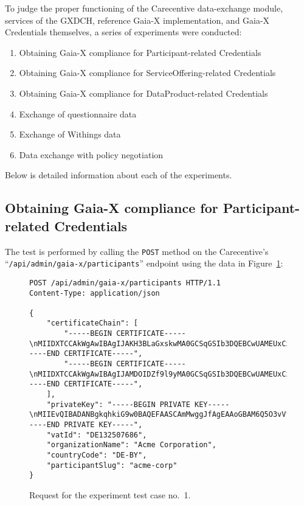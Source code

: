 To judge the proper functioning of the Carecentive data-exchange module, services of the GXDCH, reference Gaia-X implementation, and Gaia-X Credentials themselves, a series of experiments were conducted:
\begin{enumerate}
    \item Obtaining Gaia-X compliance for Participant-related Credentials
    \item Obtaining Gaia-X compliance for ServiceOffering-related Credentials
    \item Obtaining Gaia-X compliance for DataProduct-related Credentials
    \item Exchange of questionnaire data
    \item Exchange of Withings data
    \item Data exchange with policy negotiation
\end{enumerate}

Below is detailed information about each of the experiments.

\subsection[Participant Compliance]{Obtaining Gaia-X compliance for Participant-related Credentials}\label{subsec:participant-compliance}

The test is performed by calling the \texttt{POST} method on the Carecentive's ``\texttt{/api/admin/gaia-x/participants}'' endpoint using the data in Figure~\ref{fig:test_case_1}:

\begin{figure}[h]
    \centering
    \begin{verbatim}
POST /api/admin/gaia-x/participants HTTP/1.1
Content-Type: application/json

{
	"certificateChain": [
		"-----BEGIN CERTIFICATE-----\nMIIDXTCCAkWgAwIBAgIJAKH3BLaGxskwMA0GCSqGSIb3DQEBCwUAMEUxCzAJBgNV\n...\nJmCVzwB/MCuv3z4IV0IsbP5ZKh+6m0oI+RINdDl4Stxdj6LK8JspNeU0R6mBg1A=\n-----END CERTIFICATE-----",
		"-----BEGIN CERTIFICATE-----\nMIIDXTCCAkWgAwIBAgIJAMDOIDZf9l9yMA0GCSqGSIb3DQEBCwUAMEUxCzAJBgNV\n...\nv5pXVIlZm8DtRmDTUp8pNDnQ5UAZTuDPaWo3zbxZPOUmGJ1IlBOgaQvsyPCW5gU=\n-----END CERTIFICATE-----",
	],
	"privateKey": "-----BEGIN PRIVATE KEY-----\nMIIEvQIBADANBgkqhkiG9w0BAQEFAASCAmMwggJfAgEAAoGBAM6Q5O3vVfnxk6P7\n...\nYWw+HiFJh9XQpRUtv9PV8L8AqFFfMdsOpT6pgC+aA/WB\n-----END PRIVATE KEY-----",
	"vatId": "DE132507686",
	"organizationName": "Acme Corporation",
	"countryCode": "DE-BY",
	"participantSlug": "acme-corp"
}
    \end{verbatim}
    \caption{Request for the experiment test case no.~1.}\label{fig:test_case_1}
\end{figure}

